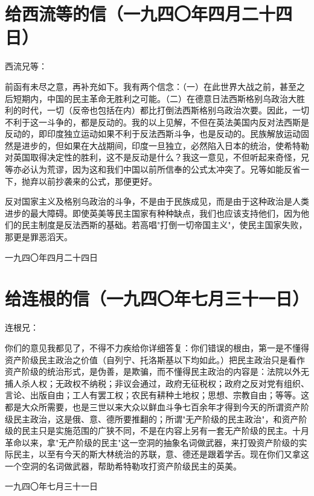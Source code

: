 \documentclass[
  openany,           %
  12pt,              %
  a4paper            %
]{ctexbook}
\begin{document}
\chapter{给西流等的信（一九四〇年四月二十四日）}

\quad\quad 西流兄等：

前函有未尽之意，再补充如下。我有两个信念：（一）在此世界大战之前，甚至之后短期内，中国的民主革命无胜利之可能。（二）在德意日法西斯格别乌政治大胜利的时代，一切（反帝也包括在内）都比打倒法西斯格别乌政治次要。因此，一切不利于这一斗争的，都是反动的。我的以上见解，不但在英法美国内反对法西斯是反动的，即印度独立运动如果不利于反法西斯斗争，也是反动的。民族解放运动固然是进步的，但如果在大战期间，印度一旦独立，必然陷入日本的统治，使希特勒对英国取得决定性的胜利，这不是反动是什么？我这一意见，不但听起来奇怪，兄等亦必认为荒谬，因为这和我们中国以前所信奉的公式太冲突了。兄等如能反省一下，抛弃以前抄袭来的公式，那便更好。

反对国家主义及格别乌政治的斗争，不是由于民族成见，而是由于这种政治是人类进步的最大障碍。即使英美等民主国家有种种缺点，我们也应该支持他们，因为他们的民主制度是反法西斯的基础。若高唱"打倒一切帝国主义"，使民主国家失败，那更是罪恶滔天。

\hfill 一九四〇年四月二十四日

\chapter{给连根的信（一九四〇年七月三十一日）}

\quad\quad 连根兄：

你们的意见我都见了，不得不力疾给你详细答复：你们错误的根由，第一是不懂得资产阶级民主政治之价值（自列宁、托洛斯基以下均如此。）把民主政治只是看作资产阶级的统治形式，是伪善，是欺骗，而不懂得民主政治的内容是：法院以外无捕人杀人权；无政权不纳税；非议会通过，政府无征税权；政府之反对党有组织、言论、出版自由；工人有罢工权；农民有耕种土地权；思想、宗教自由；等等。这都是大众所需要，也是三世以来大众以鲜血斗争七百余年才得到今天的所谓资产阶级民主政治，这是俄、意、德所要推翻的；所谓"无产阶级的民主政治"，和资产阶级的民主只是实施范围的广狭不同，不是在内容上另有一套无产阶级的民主。十月革命以来，拿"无产阶级的民主"这一空洞的抽象名词做武器，来打毁资产阶级的实际民主，以至有今天的斯大林统治的苏联，意、德还是跟着学舌。现在你们又拿这一个空洞的名词做武器，帮助希特勒攻打资产阶级民主的英美。

\hfill 一九四〇年七月三十一日
\end{document}

